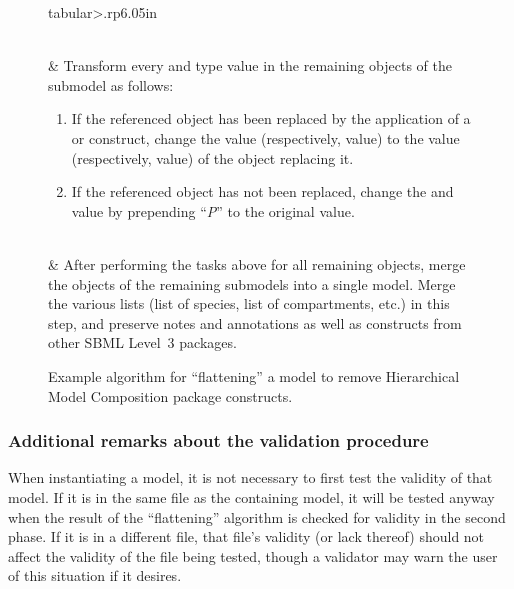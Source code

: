 \begin{figure}[thb]
\begin{edtable}{tabular}{>{\therownum.}rp{6.05in}}
\begin{enumerate}[leftmargin=3ex,label={\alph*})]
 \vspace*{-0.5em}
 \end{enumerate}
 \\

 & Transform every  and  type value in the remaining objects of the submodel as follows: \begin{enumerate}[leftmargin=3ex,label={\alph*})]

 \item If the referenced object has been replaced by the application of a \ReplacedBy or \ReplacedElement construct, change the  value (respectively,  value) to the  value (respectively,  value) of the object replacing it.

 \item If the referenced object has not been replaced, change the  and  value by prepending ``\emph{P}'' to the original value.

 \vspace*{-0.5em}
 \end{enumerate}
 \\

 & After performing the tasks above for all remaining objects, merge the objects of the remaining submodels into a single model. Merge the various lists (list of species, list of compartments, etc.) in this step, and preserve notes and annotations as well as constructs from other SBML Level~3 packages.
 \\
 \bottomrule
 \end{edtable}
 \caption{Example algorithm for ``flattening'' a model to remove Hierarchical Model Composition package constructs.}
 \label{flattening-algo}
\end{figure}


\subsubsection{Additional remarks about the validation procedure}

When \notice instantiating a model, it is not necessary to first test the validity of that model. If it is in the same file as the containing model, it will be tested anyway when the result of the ``flattening'' algorithm is checked for validity in the second phase. If it is in a different file, that file's validity (or lack thereof) should not affect the validity of the file being tested, though a validator may warn the user of this situation if it desires.


